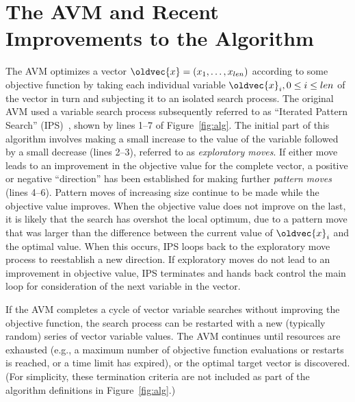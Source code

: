 \documentclass{llncs}
\let\vec\oldvec %
\newcommand{\name}{AVM\hspace{-1pt}$f$\xspace}
\newcommand{\inlineheading}[1]{\vspace{1mm} \noindent {\bf #1.}}
\begin{document}


\section{The AVM and Recent Improvements to the Algorithm}
\vspace{-1em}
\inlineheading{The original AVM} The AVM optimizes a vector $\vec{x} = (x_1, \dots, x_{len})$ according to some objective function by taking each individual variable $\vec{x}_i, 0 \leq i \leq len$ of the vector in turn and subjecting it to an isolated search process. The original AVM used a variable search process subsequently referred to as ``Iterated Pattern Search'' (IPS)~\cite{Kempka2015}, shown by lines 1--7 of Figure~\ref{fig:alg}. The initial part of this algorithm involves making a small increase to the value of the variable followed by a small decrease (lines 2--3), referred to as {\it exploratory moves}. If either move leads to an improvement in the objective value for the complete vector, a positive or negative ``direction'' has been established for making further {\it pattern moves} (lines 4--6). Pattern moves of increasing size continue to be made while the objective value improves. When the objective value does not improve on the last, it is likely that the search has overshot the local optimum, due to a pattern move that was larger than the difference between the current value of $\vec{x}_i$ and the optimal value. When this occurs, IPS loops back to the exploratory move process to reestablish a new direction. If exploratory moves do not lead to an improvement in objective value, IPS terminates and hands back control the main loop for consideration of the next variable in the vector.

If the AVM completes a cycle of vector variable searches without improving the objective function, the search process can be restarted with a new (typically random) series of vector variable values.
The AVM continues until resources are exhausted (e.g., a maximum number of objective function evaluations or restarts is reached, or a time limit has expired), or the optimal target vector is discovered. (For simplicity, these termination criteria are not included as part of the algorithm definitions in Figure~\ref{fig:alg}.)
\end{document}
